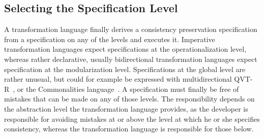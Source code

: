 

\subsection{Selecting the Specification Level}

A transformation language finally derives a consistency preservation specification from a specification on any of the levels and executes it. %
Imperative transformation languages expect specifications at the operationalization level, whereas rather declarative, usually bidirectional transformation languages expect specification at the modularization level.
Specifications at the global level are rather unusual, but could for example be expressed with multidirectional QVT-R~\cite{macedo2014a}, or the Commonalities language~\cite{gleitze2017a}.
A specification must finally be free of mistakes that can be made on any of those levels. 
The responsibility depends on the abstraction level the transformation language provides, as the developer is responsible for avoiding mistakes at or above the level at which he or she specifies consistency, whereas the transformation language is responsible for those below.

